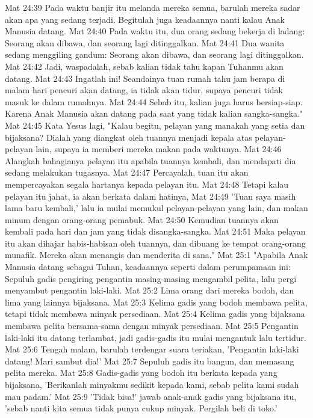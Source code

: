 Mat 24:39  Pada waktu banjir itu melanda mereka semua, barulah mereka sadar akan apa yang sedang terjadi. Begitulah juga keadaannya nanti kalau Anak Manusia datang.
Mat 24:40  Pada waktu itu, dua orang sedang bekerja di ladang: Seorang akan dibawa, dan seorang lagi ditinggalkan.
Mat 24:41  Dua wanita sedang menggiling gandum: Seorang akan dibawa, dan seorang lagi ditinggalkan.
Mat 24:42  Jadi, waspadalah, sebab kalian tidak tahu kapan Tuhanmu akan datang.
Mat 24:43  Ingatlah ini! Seandainya tuan rumah tahu jam berapa di malam hari pencuri akan datang, ia tidak akan tidur, supaya pencuri tidak masuk ke dalam rumahnya.
Mat 24:44  Sebab itu, kalian juga harus bersiap-siap. Karena Anak Manusia akan datang pada saat yang tidak kalian sangka-sangka."
Mat 24:45  Kata Yesus lagi, "Kalau begitu, pelayan yang manakah yang setia dan bijaksana? Dialah yang diangkat oleh tuannya menjadi kepala atas pelayan-pelayan lain, supaya ia memberi mereka makan pada waktunya.
Mat 24:46  Alangkah bahagianya pelayan itu apabila tuannya kembali, dan mendapati dia sedang melakukan tugasnya.
Mat 24:47  Percayalah, tuan itu akan mempercayakan segala hartanya kepada pelayan itu.
Mat 24:48  Tetapi kalau pelayan itu jahat, ia akan berkata dalam hatinya,
Mat 24:49  'Tuan saya masih lama baru kembali,' lalu ia mulai memukul pelayan-pelayan yang lain, dan makan minum dengan orang-orang pemabuk.
Mat 24:50  Kemudian tuannya akan kembali pada hari dan jam yang tidak disangka-sangka.
Mat 24:51  Maka pelayan itu akan dihajar habis-habisan oleh tuannya, dan dibuang ke tempat orang-orang munafik. Mereka akan menangis dan menderita di sana."
Mat 25:1  "Apabila Anak Manusia datang sebagai Tuhan, keadaannya seperti dalam perumpamaan ini: Sepuluh gadis pengiring pengantin masing-masing mengambil pelita, lalu pergi menyambut pengantin laki-laki.
Mat 25:2  Lima orang dari mereka bodoh, dan lima yang lainnya bijaksana.
Mat 25:3  Kelima gadis yang bodoh membawa pelita, tetapi tidak membawa minyak persediaan.
Mat 25:4  Kelima gadis yang bijaksana membawa pelita bersama-sama dengan minyak persediaan.
Mat 25:5  Pengantin laki-laki itu datang terlambat, jadi gadis-gadis itu mulai mengantuk lalu tertidur.
Mat 25:6  Tengah malam, barulah terdengar suara teriakan, 'Pengantin laki-laki datang! Mari sambut dia!'
Mat 25:7  Sepuluh gadis itu bangun, dan memasang pelita mereka.
Mat 25:8  Gadis-gadis yang bodoh itu berkata kepada yang bijaksana, 'Berikanlah minyakmu sedikit kepada kami, sebab pelita kami sudah mau padam.'
Mat 25:9  'Tidak bisa!' jawab anak-anak gadis yang bijaksana itu, 'sebab nanti kita semua tidak punya cukup minyak. Pergilah beli di toko.'
